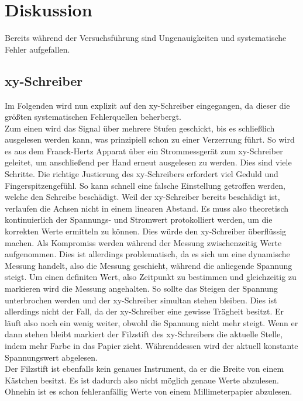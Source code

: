 


\section{Diskussion}
\label{sec:Diskussion}

Bereits während der Versuchsführung sind Ungenauigkeiten und systematische Fehler aufgefallen. 

\subsection{xy-Schreiber}
Im Folgenden wird nun explizit auf den xy-Schreiber eingegangen, da dieser die größten systematischen Fehlerquellen beherbergt.\\
Zum einen wird das Signal über mehrere Stufen geschickt, bis es schließlich ausgelesen werden kann, was prinzipiell schon zu einer 
Verzerrung führt. So wird es aus dem Franck-Hertz Apparat über ein Strommessgerät zum xy-Schreiber geleitet, um anschließend per Hand 
erneut ausgelesen zu werden. Dies sind viele Schritte. 
Die richtige Justierung des xy-Schreibers erfordert viel Geduld und Fingerspitzengefühl. So kann schnell eine falsche Einstellung getroffen 
werden, welche den Schreibe beschädigt. Weil der xy-Schreiber bereits beschädigt ist, verlaufen die Achsen nicht in einem linearen Abstand. 
Es muss also theoretisch kontinuierlich der Spannungs- und Stromwert protokolliert werden, um die korrekten Werte ermitteln zu können. Dies 
würde den xy-Schreiber überflüssig machen. Als Kompromiss werden während der Messung zwischenzeitig Werte aufgenommen. Dies ist allerdings 
problematisch, da es sich um eine dynamische Messung handelt, also die Messung geschieht, während die anliegende Spannung steigt. Um einen 
definiten Wert, also Zeitpunkt zu bestimmen und gleichzeitig zu markieren wird die Messung angehalten. So sollte das Steigen der Spannung 
unterbrochen werden und der xy-Schreiber simultan stehen bleiben. Dies ist allerdings nicht der Fall, da der xy-Schreiber eine gewisse 
Trägheit besitzt. Er läuft also noch ein wenig weiter, obwohl die Spannung nicht mehr steigt. Wenn er dann stehen bleibt markiert der 
Filzstift des xy-Schreibers die aktuelle Stelle, indem mehr Farbe in das Papier zieht. Währenddessen wird der aktuell konstante Spannungswert 
abgelesen.\\
Der Filzstift ist ebenfalls kein genaues Instrument, da er die Breite von einem Kästchen besitzt. Es ist dadurch also nicht möglich genaue 
Werte abzulesen. Ohnehin ist es schon fehleranfällig Werte von einem Millimeterpapier abzulesen.    


